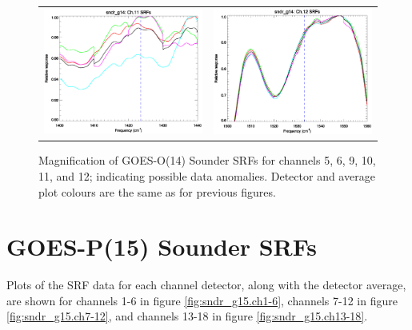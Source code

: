 \begin{figure}[htp]
\begin{tabular}{c c}
    \includegraphics[scale=0.5]{graphics/zoom_anomaly/sndr_g14.ch11.srf.eps} &
    \includegraphics[scale=0.5]{graphics/zoom_anomaly/sndr_g14.ch12.srf.eps}
  \end{tabular}
  \caption{Magnification of GOES-O(14) Sounder SRFs for channels 5, 6, 9, 10, 11, and 12; indicating possible data anomalies. Detector and average plot colours are the same as for previous figures.}
  \label{fig:sndr_g14.zoom_anomaly}
\end{figure}




\section{GOES-P(15) Sounder SRFs}
Plots of the SRF data for each channel detector, along with the detector average, are shown for channels 1-6 in figure \ref{fig:sndr_g15.ch1-6}, channels 7-12 in figure \ref{fig:sndr_g15.ch7-12}, and channels 13-18 in figure \ref{fig:sndr_g15.ch13-18}.


